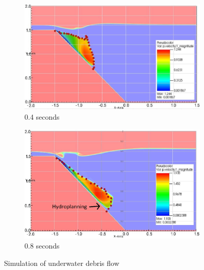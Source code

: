 \documentclass[preprint,12pt]{elsarticle}
\begin{document}
\begin{figure}
\center
\begin{subfigure}[c]{0.5\linewidth}
\includegraphics[width=\linewidth]{1.jpg}
\caption{0.4 seconds}
\label{0.4s}
\end{subfigure}\hfill    
\begin{subfigure}[d]{0.5\linewidth}
\includegraphics[width=\linewidth]{2.jpg}
\caption{0.8 seconds}
\label{0.8s}
\end{subfigure}
\caption{Simulation of underwater debris flow}
\label{fig:debris}
\end{figure}
%
%
\end{document}
